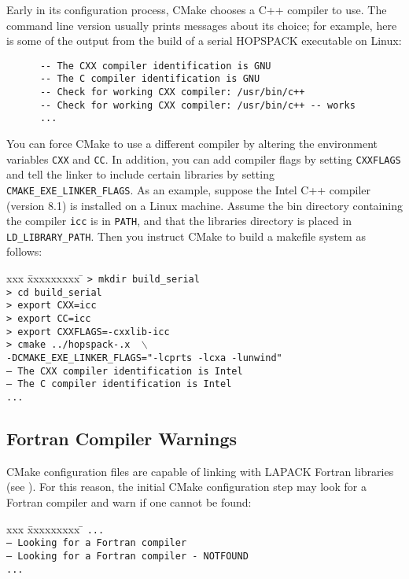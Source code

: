 Early in its configuration process, CMake chooses a C++ compiler to use.
The command line version usually prints messages about its choice; for example,
here is some of the output from the build of a serial HOPSPACK executable
on Linux:
\vspace{-11pt}
\begin{verbatim}
      -- The CXX compiler identification is GNU
      -- The C compiler identification is GNU
      -- Check for working CXX compiler: /usr/bin/c++
      -- Check for working CXX compiler: /usr/bin/c++ -- works
      ...
\end{verbatim}

You can force CMake to use a different compiler by altering the environment
variables {\tt CXX} and {\tt CC}.  In addition, you can add compiler flags
by setting {\tt CXXFLAGS} and tell the linker to include certain libraries
by setting {\tt CMAKE\_EXE\_LINKER\_FLAGS}.
As an example, suppose the Intel C++ compiler (version 8.1) is installed
on a Linux machine.  Assume the {\sf bin} directory containing the
compiler {\tt icc} is in {\tt PATH}, and that the libraries directory is
placed in {\tt LD\_LIBRARY\_PATH}.
Then you instruct CMake to build a makefile system as follows:
\vspace{-11pt}
\begin{tabbing}
  xxx \= xxxxxxxxx \= \kill
  \> {\tt > mkdir build\_serial} \\
  \> {\tt > cd build\_serial} \\
  \> {\tt > export CXX=icc} \\
  \> {\tt > export CC=icc} \\
  \> {\tt > export CXXFLAGS=-cxxlib-icc} \\
  \> {\tt > cmake ../hopspack-\HOPSVER.x  $\; \backslash$} \\
  \> \> {\tt -DCMAKE\_EXE\_LINKER\_FLAGS="-lcprts -lcxa -lunwind"} \\
  \> {\tt -- The CXX compiler identification is Intel} \\
  \> {\tt -- The C compiler identification is Intel} \\
  \> {\tt ...}
\end{tabbing}


\subsection{Fortran Compiler Warnings}

CMake configuration files are capable of linking with LAPACK Fortran
libraries (see ).  For this reason, the initial
CMake configuration step may look for a Fortran compiler and warn
if one cannot be found:
\vspace{-11pt}
\begin{tabbing}
  xxx \= xxxxxxxxx \= \kill
  \> {\tt ...} \\
  \> {\tt -- Looking for a Fortran compiler} \\
  \> {\tt -- Looking for a Fortran compiler - NOTFOUND} \\
  \> {\tt ...}
\end{tabbing}

